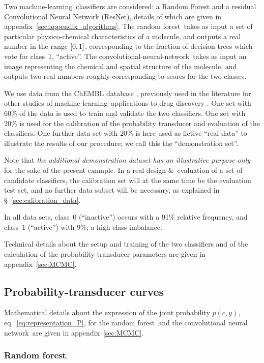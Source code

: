 \documentclass[a4paper,12pt,%
onecolumn,oneside,article,%
british%
]{memoir}
\newcommand*{\amp}{\&}
\DeclarePairedDelimiter\clcl{[}{]}
\renewcommand*{\|}[1][]{\nonscript\:#1\vert\nonscript\:\mathopen{}}
\newcommand*{\sect}{\S}%
\newcommand*{\eqn}{eq.}%
\newcommand*{\ml}{machine-learning}
\newcommand*{\RF}{random forest}
\newcommand*{\CNN}{convolutional neural network}
\newcommand*{\cnn}{convolutional-neural-network}
\begin{document}
Two \ml\ classifiers are considered: a Random Forest and a residual Convolutional Neural Network (ResNet), details of which are given in appendix~\ref{sec:appendix_algorithms}. The \RF\ takes as input a set of particular physico-chemical characteristics of a molecule, and outputs a real number in the range $\clcl{0,1}$, corresponding to the fraction of decision trees which vote for class~$1$, \enquote{active}. The \cnn\ takes as input an image representing the chemical and spatial structure of the molecule, and outputs two real numbers roughly corresponding to scores for the two classes.

We use data from the ChEMBL database \autocites{bentoetal2014}, previously used in the literature for other studies of \ml\ applications to drug discovery \autocites{koutsoukasetal2017}. One set with 60\% of the data is used to train and validate the two classifiers. One set with 20\% is used for the calibration of the probability transducer and evaluation of the classifiers. One further data set with 20\% is here used as fictive \enquote{real data} to illustrate the results of our procedure; we call this the \enquote{demonstration set}.

Note that \emph{the additional demonstration dataset has an illustrative purpose only} for the sake of the present example. In a real design \amp\ evaluation of a set of candidate classifiers, the calibration set will at the same time be the evaluation test set, and no further data subset will be necessary, as explained in \sect~\ref{sec:calibration_data}.

In all data sets, class~$0$ (\enquote{inactive}) occurs with a 91\% relative frequency, and class~$1$ (\enquote{active}) with 9\%; a high class imbalance.

Technical details about the setup and training of the two classifiers and of the calculation of the probability-transducer parameters are given in appendix~\ref{sec:MCMC}.



\subsection{Probability-transducer curves}
\label{sec:demo_curves}

Mathematical details about the expression of the joint probability $p(c,y)$, \eqn~\eqref{eq:representation_P}, for the \RF\ and the \CNN\ are given in appendix~\ref{sec:MCMC}.

\subsubsection{Random forest}
\label{sec:curve_RF}
\end{document}
